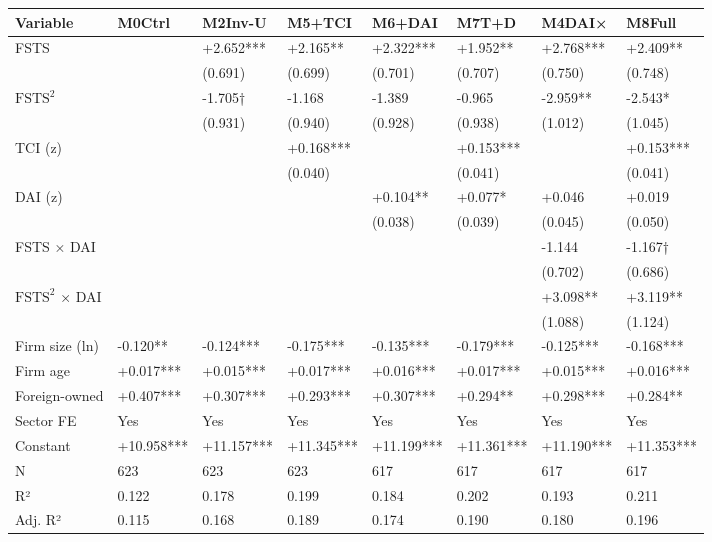 \documentclass[12pt,a4paper]{article}
\begin{document}
\begin{longtable}[]{@{}llllllll@{}}
\toprule\noalign{}
Variable & M0Ctrl & M2Inv-U & M5+TCI & M6+DAI & M7T+D & M4DAI× &
M8Full \\
\midrule\noalign{}
\endhead
\bottomrule\noalign{}
\endlastfoot
FSTS & & +2.652*** & +2.165** & +2.322*** & +1.952** & +2.768*** &
+2.409** \\
& & (0.691) & (0.699) & (0.701) & (0.707) & (0.750) & (0.748) \\
\(\mathrm{FSTS}^2\) & & -1.705† & -1.168 & -1.389 & -0.965 & -2.959** &
-2.543* \\
& & (0.931) & (0.940) & (0.928) & (0.938) & (1.012) & (1.045) \\
TCI (z) & & & +0.168*** & & +0.153*** & & +0.153*** \\
& & & (0.040) & & (0.041) & & (0.041) \\
DAI (z) & & & & +0.104** & +0.077* & +0.046 & +0.019 \\
& & & & (0.038) & (0.039) & (0.045) & (0.050) \\
FSTS × DAI & & & & & & -1.144 & -1.167† \\
& & & & & & (0.702) & (0.686) \\
\(\mathrm{FSTS}^2\) × DAI & & & & & & +3.098** & +3.119** \\
& & & & & & (1.088) & (1.124) \\
Firm size (ln) & -0.120** & -0.124*** & -0.175*** & -0.135*** &
-0.179*** & -0.125*** & -0.168*** \\
Firm age & +0.017*** & +0.015*** & +0.017*** & +0.016*** & +0.017*** &
+0.015*** & +0.016*** \\
Foreign-owned & +0.407*** & +0.307*** & +0.293*** & +0.307*** & +0.294**
& +0.298*** & +0.284** \\
Sector FE & Yes & Yes & Yes & Yes & Yes & Yes & Yes \\
Constant & +10.958*** & +11.157*** & +11.345*** & +11.199*** &
+11.361*** & +11.190*** & +11.353*** \\
N & 623 & 623 & 623 & 617 & 617 & 617 & 617 \\
R² & 0.122 & 0.178 & 0.199 & 0.184 & 0.202 & 0.193 & 0.211 \\
Adj. R² & 0.115 & 0.168 & 0.189 & 0.174 & 0.190 & 0.180 & 0.196 \\
\end{longtable}
\end{document}
